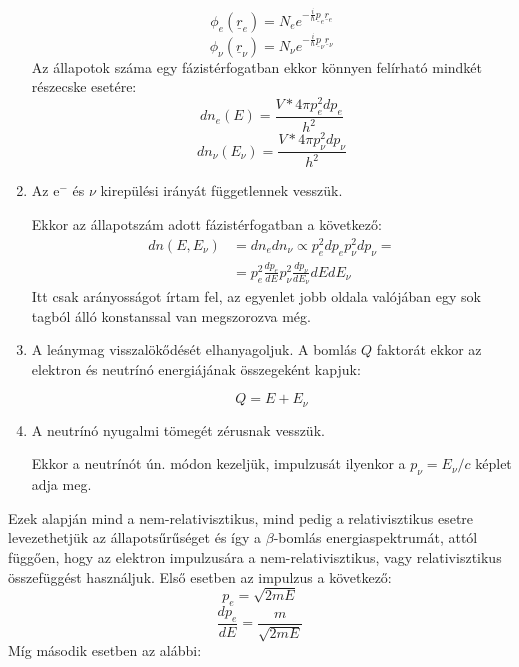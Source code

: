 \begin{multicols}{2}
\begin{enumerate}
\begin{equation}
\phi_{e} \left( \underline{r}_{e} \right)
=
N_{e} e^{-\frac{i}{\hbar} \underline{p}_{e} \underline{r}_{e}}
\end{equation}
\begin{equation}
\phi_{\nu} \left( \underline{r}_{\nu} \right)
=
N_{\nu} e^{-\frac{i}{\hbar} \underline{p}_{\nu} \underline{r}_{\nu}}
\end{equation}
Az állapotok száma egy fázistérfogatban ekkor könnyen felírható mindkét részecske esetére:
\begin{equation}
dn_{e} \left( E \right)
=
\frac{V * 4 \pi p_{e}^{2} dp_{e}}{h^{2}}
\end{equation}
\begin{equation}
dn_{\nu} \left( E_{\nu} \right)
=
\frac{V * 4 \pi p_{\nu}^{2} dp_{\nu}}{h^{2}}
\end{equation}

\item Az e$^-$ és $\nu$ kirepülési irányát függetlennek vesszük. \par
Ekkor az állapotszám adott fázistérfogatban a következő:
\begin{align}
dn \left( E, E_{\nu} \right)
&=
dn_{e} dn_{\nu}
\propto
p_{e}^{2} dp_{e} p_{\nu}^{2} dp_{\nu}
= \nonumber \\
&=
p_{e}^{2} \frac{dp_{e}}{dE} p_{\nu}^{2} \frac{dp_{\nu}}{dE_{\nu}} dE dE_{\nu}
\end{align}
Itt csak arányosságot írtam fel, az egyenlet jobb oldala valójában egy sok tagból álló konstanssal van megszorozva még.

\item A leánymag visszalökődését elhanyagoljuk. A bomlás $Q$ faktorát ekkor az elektron és neutrínó energiájának összegeként kapjuk:

\begin{equation}
Q = E + E_{\nu}
\end{equation}

\item A neutrínó nyugalmi tömegét zérusnak vesszük. \par
Ekkor a neutrínót ún.  módon kezeljük, impulzusát ilyenkor a $p_{\nu} = E_{\nu}/c$ képlet adja meg.
\end{enumerate}
Ezek alapján mind a nem-relativisztikus, mind pedig a relativisztikus esetre levezethetjük az állapotsűrűséget és így a $\beta$-bomlás energiaspektrumát, attól függően, hogy az elektron impulzusára a nem-relativisztikus, vagy relativisztikus összefüggést használjuk. Első esetben az impulzus a következő:
\begin{equation}
p_{e}
=
\sqrt{2mE}
\end{equation}
\begin{equation}
\frac{dp_{e}}{dE}
=
\frac{m}{\sqrt{2mE}}
\end{equation}
Míg második esetben az alábbi:


\end{multicols}

